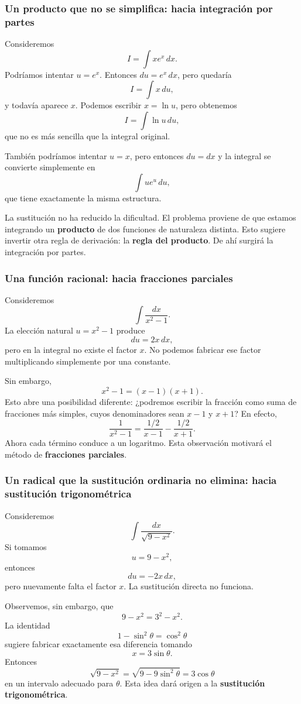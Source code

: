 \documentclass[12pt]{article}
\theoremstyle{definition}
\theoremstyle{remark}
\begin{document}
\subsubsection*{Un producto que no se simplifica: hacia integración por partes}

Consideremos
\[
I=\int xe^x\,dx.
\]
Podríamos intentar $u=e^x$. Entonces $du=e^x\,dx$, pero quedaría
\[
I=\int x\,du,
\]
y todavía aparece $x$. Podemos escribir $x=\ln u$, pero obtenemos
\[
I=\int\ln u\,du,
\]
que no es más sencilla que la integral original.

También podríamos intentar $u=x$, pero entonces $du=dx$ y la integral se convierte simplemente en
\[
\int ue^u\,du,
\]
que tiene exactamente la misma estructura.

La sustitución no ha reducido la dificultad. El problema proviene de que estamos integrando un \textbf{producto} de dos funciones de naturaleza distinta. Esto sugiere invertir otra regla de derivación: la \textbf{regla del producto}. De ahí surgirá la integración por partes.

\subsubsection*{Una función racional: hacia fracciones parciales}

Consideremos
\[
\int\frac{dx}{x^2-1}.
\]
La elección natural $u=x^2-1$ produce
\[
du=2x\,dx,
\]
pero en la integral no existe el factor $x$. No podemos fabricar ese factor multiplicando simplemente por una constante.

Sin embargo,
\[
x^2-1=(x-1)(x+1).
\]
Esto abre una posibilidad diferente: ¿podremos escribir la fracción como suma de fracciones más simples, cuyos denominadores sean $x-1$ y $x+1$? En efecto,
\[
\frac1{x^2-1}
=\frac{1/2}{x-1}-\frac{1/2}{x+1}.
\]
Ahora cada término conduce a un logaritmo. Esta observación motivará el método de \textbf{fracciones parciales}.

\subsubsection*{Un radical que la sustitución ordinaria no elimina: hacia sustitución trigonométrica}

Consideremos
\[
\int\frac{dx}{\sqrt{9-x^2}}.
\]
Si tomamos
\[
u=9-x^2,
\]
entonces
\[
du=-2x\,dx,
\]
pero nuevamente falta el factor $x$. La sustitución directa no funciona.

Observemos, sin embargo, que
\[
9-x^2=3^2-x^2.
\]
La identidad
\[
1-\sin^2\theta=\cos^2\theta
\]
sugiere fabricar exactamente esa diferencia tomando
\[
x=3\sin\theta.
\]
Entonces
\[
\sqrt{9-x^2}
=\sqrt{9-9\sin^2\theta}
=3\cos\theta
\]
en un intervalo adecuado para $\theta$. Esta idea dará origen a la \textbf{sustitución trigonométrica}.
\end{document}
